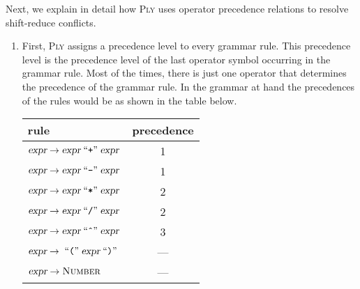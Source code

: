 \noindent
Next, we explain in detail how \textsc{Ply} uses operator precedence relations to resolve shift-reduce conflicts.
\begin{enumerate}
\item First, \textsc{Ply} assigns a precedence level to every grammar rule.  This precedence level is the
      precedence level of the last operator symbol occurring in the grammar rule.  Most of the times, there is just
      one operator that determines the precedence of the grammar rule. 
      In the grammar at hand the precedences of the rules would be as shown in the table below. 
      \begin{center}
        \begin{tabular}[t]{|l|c|}
          \hline
          rule                          & precedence  \\
          \hline
          \hline
          $\textsl{expr} \rightarrow \textsl{expr} \;\mbox{``\texttt{+}''}\; \textsl{expr}$ & 1          \\
          \hline
          $\textsl{expr} \rightarrow \textsl{expr} \;\mbox{``\texttt{-}''}\; \textsl{expr}$ & 1          \\
          \hline
          $\textsl{expr} \rightarrow \textsl{expr} \;\mbox{``\texttt{*}''}\; \textsl{expr}$ & 2          \\
          \hline
          $\textsl{expr} \rightarrow \textsl{expr} \;\mbox{``\texttt{/}''}\; \textsl{expr}$ & 2          \\
          \hline
          $\textsl{expr} \rightarrow \textsl{expr} \;\mbox{``\texttt{\^}''}\; \textsl{expr}$ & 3          \\
          \hline
          $\textsl{expr} \rightarrow \;\mbox{``\texttt{(}''}\; \textsl{expr} \;\mbox{``\texttt{)}''}\;$ & --- \\
          \hline
          $\textsl{expr} \rightarrow \textsc{Number}$ & --- \\
          \hline
        \end{tabular}
      \end{center}


\end{enumerate}

